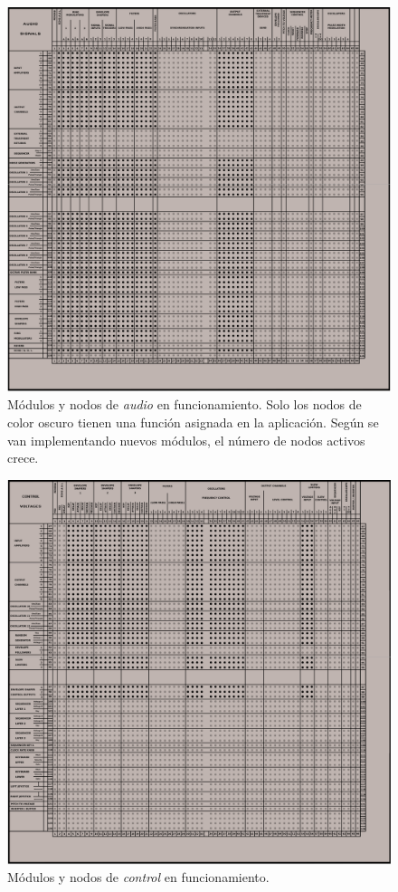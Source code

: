 \begin{figure}
	\centering
	\includegraphics[width=1\textwidth]{nodos_enabled_audio}
	\caption[Módulos y nodos de \textit{audio} en funcionamiento]{Módulos y nodos de \textit{audio} en funcionamiento. Solo los nodos de color oscuro tienen una función asignada en la aplicación. Según se van implementando nuevos módulos, el número de nodos activos crece.}
	\label{fig:nodos_enabled_audio}
\end{figure}

\begin{figure}
	\centering
	\includegraphics[width=1\textwidth]{nodos_enabled_control}
	\caption[Módulos y nodos de \textit{control} en funcionamiento]{Módulos y nodos de \textit{control} en funcionamiento.}
	\label{fig:nodos_enabled_control}
\end{figure}

